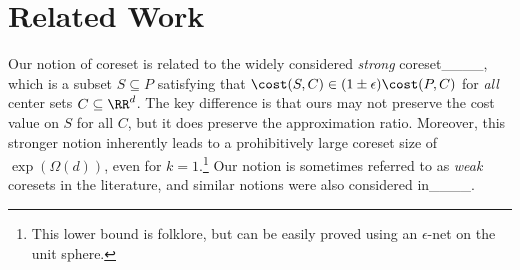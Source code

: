 \section{Related Work}
\label{sec:related}



Our notion of coreset is related to the widely considered \emph{strong} coreset____,
which is a subset $S \subseteq P$ satisfying that $\cost(S, C) \in (1 \pm \epsilon) \cost(P, C)$ for \emph{all} center sets $C \subseteq \RR^d$.
The key difference is that ours may not preserve the cost value on $S$ for all $C$,
but it does preserve the approximation ratio.
Moreover, this stronger notion inherently leads to a prohibitively large coreset size of $\exp(\Omega(d))$, even for $k = 1$.\footnote{This lower bound is folklore, but can be easily proved using an $\epsilon$-net on the unit sphere.
}
Our notion is sometimes referred to as \emph{weak} coresets in the literature, and similar notions were also considered in____.